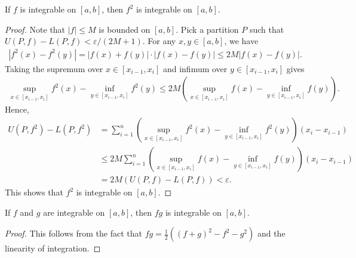 \begin{theorem}
    If $f$ is integrable on $[a,b]$, then $f^2$ is integrable on $[a,b]$.    
\end{theorem}
\begin{proof}
    Note that $|f|\le M$ is bounded on $[a,b]$. Pick a partition $P$ such that $U(P,f) - L(P,f) < \varepsilon/(2M+1)$. For any $x,y\in[a,b]$, we have
    \begin{align*}
        |f^2(x) - f^2(y)| = |f(x) + f(y)| \cdot |f(x) - f(y)| \le 2M |f(x) - f(y)|.
    \end{align*}
    Taking the supremum over $x\in[x_{i-1}, x_i]$ and infimum over $y\in[x_{i-1}, x_i]$ gives
    \begin{align*}
        \sup_{x\in[x_{i-1}, x_i]} f^2(x) - \inf_{y\in[x_{i-1}, x_i]} f^2(y) \le 2M (\sup_{x\in[x_{i-1}, x_i]} f(x) - \inf_{y\in[x_{i-1}, x_i]} f(y)).
    \end{align*}
    Hence,
    \begin{align*}
        U(P,f^2) - L(P,f^2) &= \sum_{i=1}^{n} (\sup_{x\in[x_{i-1}, x_i]} f^2(x) - \inf_{y\in[x_{i-1}, x_i]} f^2(y))(x_i - x_{i-1}) \\
        &\le 2M \sum_{i=1}^{n} (\sup_{x\in[x_{i-1}, x_i]} f(x) - \inf_{y\in[x_{i-1}, x_i]} f(y))(x_i - x_{i-1}) \\
        &= 2M (U(P,f) - L(P,f)) < \varepsilon.
    \end{align*}
    This shows that $f^2$ is integrable on $[a,b]$.
\end{proof}

\begin{corollary}
    If $f$ and $g$ are integrable on $[a,b]$, then $fg$ is integrable on $[a,b]$.
\end{corollary}
\begin{proof}
    This follows from the fact that $fg = \frac{1}{2}((f+g)^2 - f^2 - g^2)$ and the linearity of integration.
\end{proof}